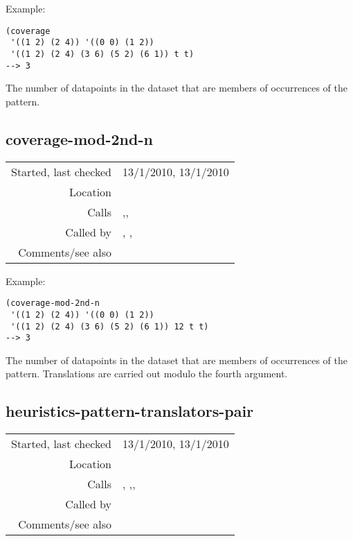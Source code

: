 \vspace{0.5cm}
\noindent Example:
\begin{verbatim}
(coverage
 '((1 2) (2 4)) '((0 0) (1 2))
 '((1 2) (2 4) (3 6) (5 2) (6 1)) t t)
--> 3
\end{verbatim}

\noindent The number of datapoints in the dataset that
are members of occurrences of the pattern.


\subsection*{coverage-mod-2nd-n}\label{fun:coverage-mod-2nd-n}

\vspace{0.3cm}
\begin{tabular}{r|p{8cm}}
Started, last checked & 13/1/2010, 13/1/2010 \\
Location & \nameref{sec:evaluation-heuristics} \\
Calls & \nameref{fun:intersection-multidimensional},\newline \nameref{fun:translations-mod-2nd-n},\newline\nameref{fun:unions-multidimensional-sorted-asc} \\
Called by & \nameref{fun:compression-ratio}, \nameref{fun:cover-ratio},\newline \nameref{fun:heuristics-pattern-translators-pair} \\
Comments/see also & \nameref{fun:coverage}
\end{tabular}

\vspace{0.5cm}
\noindent Example:
\begin{verbatim}
(coverage-mod-2nd-n
 '((1 2) (2 4)) '((0 0) (1 2))
 '((1 2) (2 4) (3 6) (5 2) (6 1)) 12 t t)
--> 3
\end{verbatim}

\noindent The number of datapoints in the dataset that
are members of occurrences of the pattern.
Translations are carried out modulo the fourth
argument.


\subsection*{heuristics-pattern-translators-pair}\label{fun:heuristics-pattern-translators-pair}

\vspace{0.3cm}
\begin{tabular}{r|p{8cm}}
Started, last checked & 13/1/2010, 13/1/2010 \\
Location & \nameref{sec:evaluation-heuristics} \\
Calls & \nameref{fun:compactness-max}, \nameref{fun:compression-ratio},\newline \nameref{fun:cover-ratio}, \nameref{fun:coverage} \\
Called by & \nameref{fun:heuristics-pattern-translators-pairs} \\
Comments/see also &
\end{tabular}

